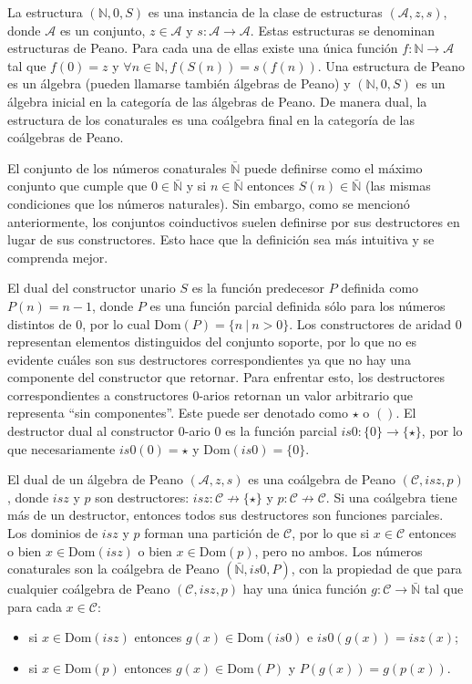 La estructura $(\mathbb{N},0,S)$ es una instancia de la clase de estructuras $(\mathcal{A},z,s)$, donde $\mathcal{A}$ es un conjunto, $z \in \mathcal{A}$ y $s: \mathcal{A} \rightarrow \mathcal{A}$. Estas estructuras se denominan estructuras de Peano. Para cada una de ellas existe una única función $f : \mathbb{N} \rightarrow \mathcal{A}$ tal que $f(0) = z$ y $\forall n \in \mathbb{N}, f(S(n)) = s(f(n))$. Una estructura de Peano es un álgebra (pueden llamarse también álgebras de Peano) y $(\mathbb{N},0,S)$ es un álgebra inicial en la categoría de las álgebras de Peano.
De manera dual, la estructura de los conaturales es una coálgebra final en la categoría de las coálgebras de Peano. 

El conjunto de los números conaturales $\bar{\mathbb{N}}$ puede definirse como el máximo conjunto que cumple que $0 \in \bar{\mathbb{N}}$ y si $n \in \bar{\mathbb{N}}$ entonces $S(n) \in \bar{\mathbb{N}}$ (las mismas condiciones que los números naturales). Sin embargo, como se mencionó anteriormente, los conjuntos coinductivos suelen definirse por sus destructores en lugar de sus constructores. Esto hace que la definición sea más intuitiva y se comprenda mejor. 

El dual del constructor unario $S$ es la función predecesor $P$ definida como $P(n) = n-1$, donde $P$ es una función parcial definida sólo para los números distintos de $0$, por lo cual $\mathrm{Dom}(P) = \{n \ |\  n > 0\}$. Los constructores de aridad $0$ representan elementos distinguidos del conjunto soporte, por lo que no es evidente cuáles son sus destructores correspondientes ya que no hay una componente del constructor que retornar. Para enfrentar esto, los destructores correspondientes a constructores 0-arios retornan un valor arbitrario que representa ``sin componentes''. Este puede ser denotado como $\star$ o $()$. El destructor dual al constructor 0-ario $0$ es la función parcial $is0 : \{0\} \rightarrow \{\star\}$, por lo que necesariamente $is0(0) = \star$ y $\mathrm{Dom}(is0) = \{0\}$. 

El dual de un álgebra de Peano $(\mathcal{A},z,s)$ es una coálgebra de Peano $(\mathcal{C},isz,p)$, donde $isz$ y $p$ son destructores: $isz: \mathcal{C} \nrightarrow  \{\star\}$ y $p : \mathcal{C} \nrightarrow \mathcal{C}$. Si una coálgebra tiene más de un destructor, entonces todos sus destructores son funciones parciales. Los dominios de $isz$ y $p$ forman una partición de $\mathcal{C}$, por lo que si $x \in \mathcal{C}$ entonces o bien $x \in \mathrm{Dom}(isz)$ o bien $x \in \mathrm{Dom}(p)$, pero no ambos. Los números conaturales son la coálgebra de Peano $(\bar{\mathbb{N}},is0,P)$, con la propiedad de que para cualquier coálgebra de Peano $(\mathcal{C},isz,p)$ hay una única función $g : \mathcal{C} \rightarrow \bar{\mathbb{N}}$ tal que para cada $x \in \mathcal{C}$:
\begin{itemize}
\item si $x \in \mathrm{Dom}(isz)$ entonces $g(x) \in \mathrm{Dom}(is0)$ e $is0(g(x)) = isz(x)$;
\item si $x \in \mathrm{Dom}(p)$ entonces $g(x) \in \mathrm{Dom}(P)$ y $P(g(x)) = g(p(x))$.
\end{itemize}


